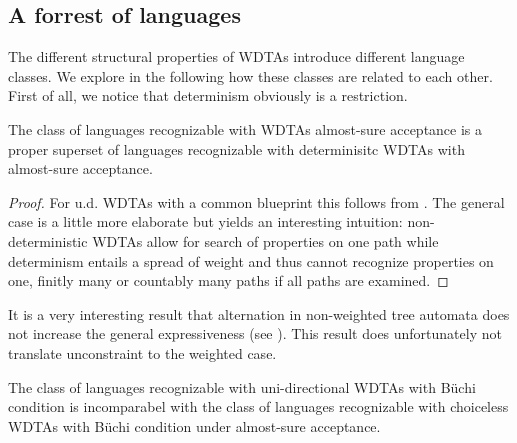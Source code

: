 \subsection{A forrest of languages}
The different structural properties of \acp{WDTA} introduce different language
classes. We explore in the following how these classes are related to each
other. First of all, we notice that determinism obviously is a restriction.
\begin{proposition}
  The class of languages recognizable with \acp{WDTA} almost-sure acceptance
  is a proper superset of languages recognizable with determinisitc \acp{WDTA}
  with almost-sure acceptance.
\end{proposition}
\begin{proof}
  For u.d. \acp{WDTA} with a common blueprint this follows from
  \cite[Proposition 10]{RandAutoInfTrees}.
  The general case is a little more elaborate but yields an interesting
  intuition: non-deterministic \acp{WDTA} allow for search of properties on
  one path while determinism entails a spread of weight and thus cannot
  recognize properties on one, finitly many or countably many paths if all
  paths are examined. 
\end{proof}
It is a very interesting result that alternation in non-weighted tree automata
does not increase the general expressiveness (see \cite{SimAltTreeAuto}).
This result does unfortunately not translate unconstraint to the weighted case.
\begin{proposition}
  The class of languages recognizable with uni-directional \acp{WDTA} with
  Büchi condition is incomparabel with the class of languages recognizable with
  choiceless \acp{WDTA} with Büchi condition under almost-sure acceptance.
\end{proposition}
